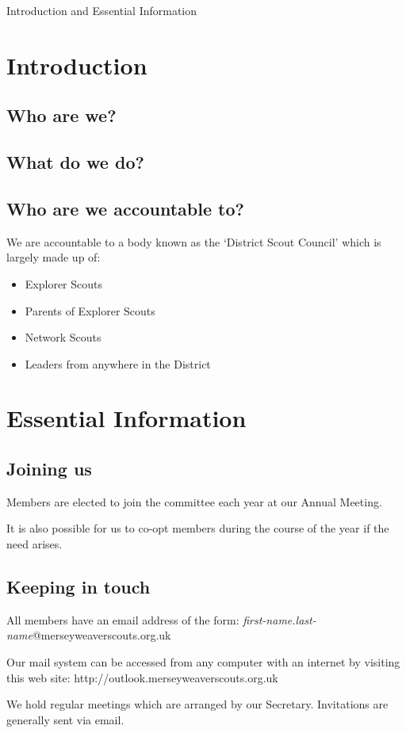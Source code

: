 \documentclass[12pt,foldmark,notumble]{leaflet}
\begin{document}
{Introduction and Essential Information}

\withrotationtrue
\section{Introduction}
\withrotationfalse

\subsection{Who are we?}

\subsection{What do we do?}

\subsection{Who are we accountable to?}
We are accountable to a body known as the `District Scout Council' which is largely made up of:
\begin{itemize}
    \item Explorer Scouts
    \item Parents of Explorer Scouts
    \item Network Scouts
    \item Leaders from anywhere in the District
\end{itemize}
\newpage

\withrotationtrue
\section{Essential Information}
\withrotationfalse
\subsection{Joining us}
Members are elected to join the committee each year at our Annual Meeting.

It is also possible for us to co-opt members during the course of the year if the need arises.

\subsection{Keeping in touch}
All members have an email address of the form: \textit{first-name.last-name}@merseyweaverscouts.org.uk

Our mail system can be accessed from any computer with an internet by visiting this web site: http://outlook.merseyweaverscouts.org.uk

We hold regular meetings which are arranged by our Secretary. Invitations are generally sent via email.
\newpage




\end{document}
